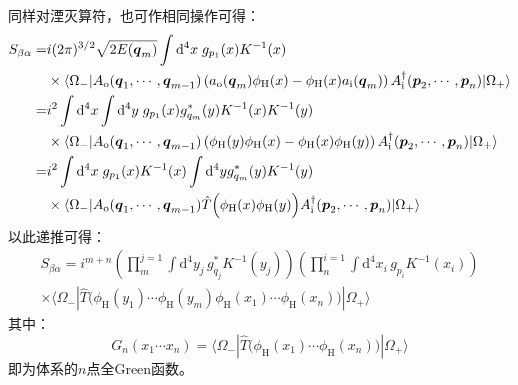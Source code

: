 同样对湮灭算符，也可作相同操作可得：
	\begin{align}
	S_{\beta\alpha}=&i(2\pi)^{3/2}\sqrt{2E(\boldsymbol{q}_m)}\int\mathrm{d}^4x \;g_{{p}_1}(x)K^{-1}(x)\notag\\&\times\langle\Omega_-|A_{\text{o}}(\boldsymbol{q}_1,\cdots,\boldsymbol{q}_{m-1})\left(a_{\text{o}}(\boldsymbol{q}_m)\phi_{\text{H}}(x)-\phi_{\text{H}}(x)a_{\text{i}}(\boldsymbol{q}_m)\right)A^\dagger_{\text{i}}(\boldsymbol{p}_2,\cdots,\boldsymbol{p}_n)|\Omega_+\rangle\notag\\
	=&i^2\int\mathrm{d}^4x\int\mathrm{d}^4y \;g_{{p}_1}(x)g^*_{{q}_m}(y)K^{-1}(x)K^{-1}(y)\notag\\
	&\times\langle\Omega_-|A_{\text{o}}(\boldsymbol{q}_1,\cdots,\boldsymbol{q}_{m-1})\left(\phi_{\text{H}}(y)\phi_{\text{H}}(x)-\phi_{\text{H}}(x)\phi_{\text{H}}(y)\right)A^\dagger_{\text{i}}(\boldsymbol{p}_2,\cdots,\boldsymbol{p}_n)|\Omega_+\rangle\notag\\
	=&i^2\int\mathrm{d}^4x\;g_{{p}_1}(x)K^{-1}(x)\int\mathrm{d}^4y g^*_{{q}_m}(y)K^{-1}(y)\notag\\
	&\times\langle\Omega_-|A_{\text{o}}(\boldsymbol{q}_1,\cdots,\boldsymbol{q}_{m-1})\hat{T}\Big(\phi_{\text{H}}(x)\phi_{\text{H}}(y)\Big)A^\dagger_{\text{i}}(\boldsymbol{p}_2,\cdots,\boldsymbol{p}_n)|\Omega_+\rangle
	\end{align}
以此递推可得：
\begin{multline}
S_{\beta\alpha}=i^{m+n}\left(\prod_{m}^{j=1}\int\mathrm{d}^4y_j\,g^*_{{q}_j}K^{-1}(y_j)\right)\left(\prod_{n}^{i=1}\int\mathrm{d}^4x_i\,g_{{p}_i}K^{-1}(x_i)\right)\\
\times\langle\Omega_-|\hat{T}\Big(\phi_{\text{H}}(y_1)\cdots\phi_{\text{H}}(y_m)\phi_{\text{H}}(x_1)\cdots\phi_{\text{H}}(x_n)\Big)|\Omega_+\rangle
\end{multline}
其中：
\begin{equation}
G_n(x_1\cdots x_n)=\langle\Omega_-|\hat{T}\Big(\phi_{\text{H}}(x_1)\cdots\phi_{\text{H}}(x_n)\Big)|\Omega_+\rangle
\end{equation}
即为体系的$n$点全Green函数。

